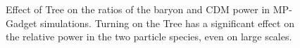 \documentclass[]{article}
\begin{document}
\begin{figure}[h]
	\caption{Effect of Tree on the ratios of the baryon and CDM power in MP-Gadget simulations. Turning on the Tree has a significant effect on the relative power in the two particle species, even on large scales.}
\end{figure}

\clearpage
\end{document}
